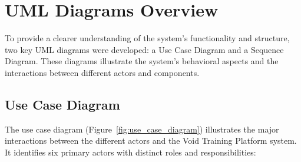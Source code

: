 \section{UML Diagrams Overview}

\noindent
To provide a clearer understanding of the system's functionality and structure, two key UML diagrams were developed: a Use Case Diagram and a Sequence Diagram. These diagrams illustrate the system's behavioral aspects and the interactions between different actors and components.

\subsection{Use Case Diagram}

\noindent
The use case diagram (Figure~\ref{fig:use_case_diagram}) illustrates the major interactions between the different actors and the Void Training Platform system. It identifies six primary actors with distinct roles and responsibilities:



